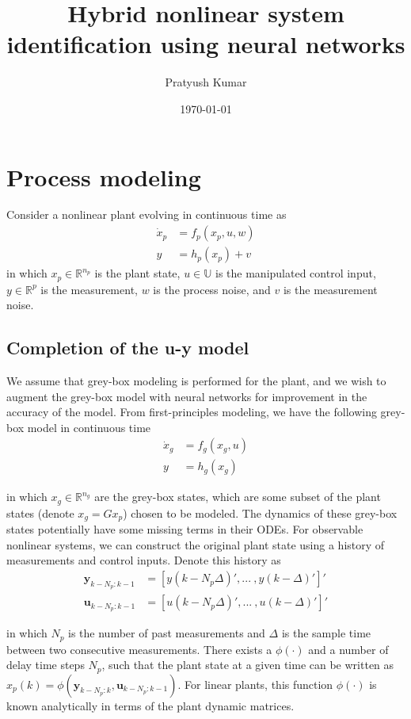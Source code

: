 \documentclass{article}
\title{Hybrid nonlinear system identification using neural networks}
\author{Pratyush Kumar}
\date{\today}
\newcommand{\bbR}{\mathbb{R}} \newcommand{\bbW}{\mathbb{W}}
\newcommand{\bbU}{\mathbb{U}} \newcommand{\bbI}{\mathbb{I}}
\begin{document}
\maketitle

\section{Process modeling}
Consider a nonlinear plant evolving in continuous time as
\begin{align*}
  \dot{x}_p &= f_p(x_p, u, w) \\
  y &= h_p(x_p) + v
\end{align*}
in which $x_p \in \bbR^{n_p}$ is the plant state, $u \in \bbU$ is the
manipulated control input, $y \in \bbR^p$ is the measurement, $w$ is the process
noise, and $v$ is the measurement noise.

\subsection{Completion of the u-y model}
We assume that grey-box modeling is performed for the plant, and we wish to
augment the grey-box model with neural networks for improvement in the accuracy
of the model. From first-principles modeling, we have the following grey-box
model in continuous time
\begin{align*}
  \dot{x}_g &= f_g(x_g, u) \\
  y &= h_g(x_g)
\end{align*}

in which $x_g \in \bbR^{n_g}$ are the grey-box states, which are some subset of
the plant states (denote $x_g = Gx_p$) chosen to be modeled. The dynamics of
these grey-box states potentially have some missing terms in their ODEs. For
observable nonlinear systems, we can construct the original plant state using a
history of measurements and control inputs. Denote this history as 
\begin{align*}
  \mathbf{y}_{k-N_p:k-1} &= [y(k-N_p\Delta)', ... \ , y(k-\Delta)']' \\
  \mathbf{u}_{k-N_p:k-1} &= [u(k-N_p\Delta)', 
                               ... \ , u(k-\Delta)']'
\end{align*}

in which $N_p$ is the number of past measurements and $\Delta$ is the sample
time between two consecutive measurements. There exists a $\phi(\cdot)$ and a
number of delay time steps $N_p$, such that the plant state at a given time can
be written as $x_p(k) = \phi(\mathbf{y}_{k-N_p:k}, \mathbf{u}_{k-N_p:k-1})$. For
linear plants, this function $\phi(\cdot)$ is known analytically in terms of the
plant dynamic matrices.
\end{document}

